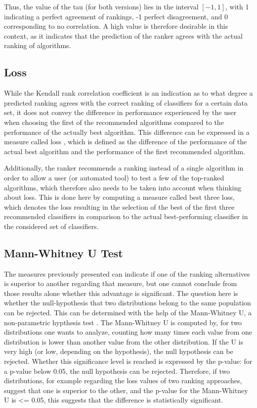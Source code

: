 Thus, the value of the tau (for both versions) lies in the interval $[-1,1]$, with 1 indicating a perfect agreement of rankings, -1 perfect disagreement, and 0 corresponding to no correlation. A high value is therefore desirable in this context, as it indicates that the prediction of the ranker agrees with the actual ranking of algorithms.

\subsection{Loss}
While the Kendall rank correlation coefficient is an indication as to what degree a predicted ranking agrees with the correct ranking of classifiers for a certain data set, it does not convey the difference in performance experienced by the user when choosing the first of the recommended algorithms compared to the performance of the actually best algorithm. This difference can be expressed in a measure called loss \cite{DBLP:conf/mldm/LeiteBV12}, which is defined as the difference of the performance of the actual best algorithm and the performance of the first recommended algorithm. 

Additionally, the ranker recommends a ranking instead of a single algorithm in order to allow a user (or automated tool) to test a few of the top-ranked algorithms, which therefore also needs to be taken into account when thinking about loss. This is done here by computing a measure called best three loss, which denotes the loss resulting in the selection of the best of the first three recommended classifiers in comparison to the actual best-performing classifier in the considered set of classifiers. 

\subsection{Mann-Whitney U Test}
The measures previously presented can indicate if one of the ranking alternatives is superior to another regarding that measure, but one cannot conclude from those results alone whether this advantage is significant. The question here is whether the null-hypothesis that two distributions belong to the same population can be rejected. This can be determined with the help of the Mann-Whitney U, a non-parametric hypthesis test \cite{mann1947test}. The Mann-Whitney U is computed by, for two distributions one wants to analyze, counting how many times each value from one distribution is lower than another value from the other distribution. If the U is very high (or low, depending on the hypothesis), the null hypothesis can be rejected. Whether this significance level is reached is expressed by the p-value: for a p-value below 0.05, the null hypothesis can be rejected. Therefore, if two distributions, for example regarding the loss values of two ranking approaches, suggest that one is superior to the other, and the p-value for the Mann-Whitney U is <= 0.05, this suggests that the difference is statistically significant.

